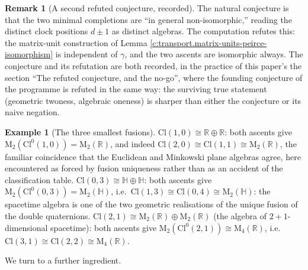 \documentclass[11pt]{article}
\theoremstyle{definition}
\newtheorem{remark}[theorem]{Remark}
\newtheorem{example}[theorem]{Example}
\theoremstyle{plain}
\providecommand{\Cl}{}\renewcommand{\Cl}{\mathrm{Cl}}
\providecommand{\HH}{}\renewcommand{\HH}{\mathbb{H}}
\providecommand{\Mat}{}\renewcommand{\Mat}{\mathrm{M}}
\providecommand{\R}{}\renewcommand{\R}{\mathbb{R}}
\begin{document}
\begin{remark}[A second refuted conjecture, recorded]\label{c:note.transport.second-refuted-conjecture-recorded}
The natural conjecture is that the two minimal completions are ``in general non-isomorphic,'' reading the distinct clock positions $d \pm 1$ as distinct algebras. The computation refutes this: the matrix-unit construction of Lemma \ref{c:transport.matrix-units-peirce-isomorphism} is independent of $\gamma$, and the two ascents are isomorphic always. The conjecture and its refutation are both recorded, in the practice of this paper's the section ``The refuted conjecture, and the no-go'', where the founding conjecture of the programme is refuted in the same way: the surviving true statement (geometric twoness, algebraic oneness) is sharper than either the conjecture or its naive negation.
\end{remark}

\begin{example}[The three smallest fusions]\label{c:note.transport.three-smallest-fusions}
$\Cl(1,0) \cong \R \oplus \R$: both ascents give $\Mat_2(\Cl^0(1,0)) = \Mat_2(\R)$, and indeed $\Cl(2,0) \cong \Cl(1,1) \cong \Mat_2(\R)$, the familiar coincidence that the Euclidean and Minkowski plane algebras agree, here encountered as forced by fusion uniqueness rather than as an accident of the classification table. $\Cl(0,3) \cong \HH \oplus \HH$: both ascents give $\Mat_2(\Cl^0(0,3)) = \Mat_2(\HH)$, i.e.\ $\Cl(1,3) \cong \Cl(0,4) \cong \Mat_2(\HH)$: the spacetime algebra is one of the two geometric realisations of the unique fusion of the double quaternions. $\Cl(2,1) \cong \Mat_2(\R) \oplus \Mat_2(\R)$ (the algebra of $2{+}1$-dimensional spacetime): both ascents give $\Mat_2(\Cl^0(2,1)) \cong \Mat_4(\R)$, i.e.\ $\Cl(3,1) \cong \Cl(2,2) \cong \Mat_4(\R)$.
\end{example}

We turn to a further ingredient.
\end{document}
